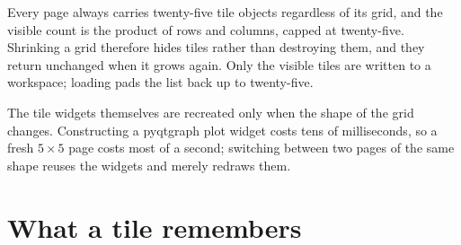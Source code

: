 \documentclass[11pt,a4paper,oneside]{report}
\begin{document}
Every page always carries twenty-five tile objects regardless of its grid, and
the visible count is the product of rows and columns, capped at twenty-five.
Shrinking a grid therefore hides tiles rather than destroying them, and they
return unchanged when it grows again. Only the visible tiles are written to a
workspace; loading pads the list back up to twenty-five.

The tile widgets themselves are recreated only when the shape of the grid
changes. Constructing a pyqtgraph plot widget costs tens of milliseconds, so a
fresh $5 \times 5$ page costs most of a second; switching between two pages of
the same shape reuses the widgets and merely redraws them.

\section{What a tile remembers}
\end{document}
